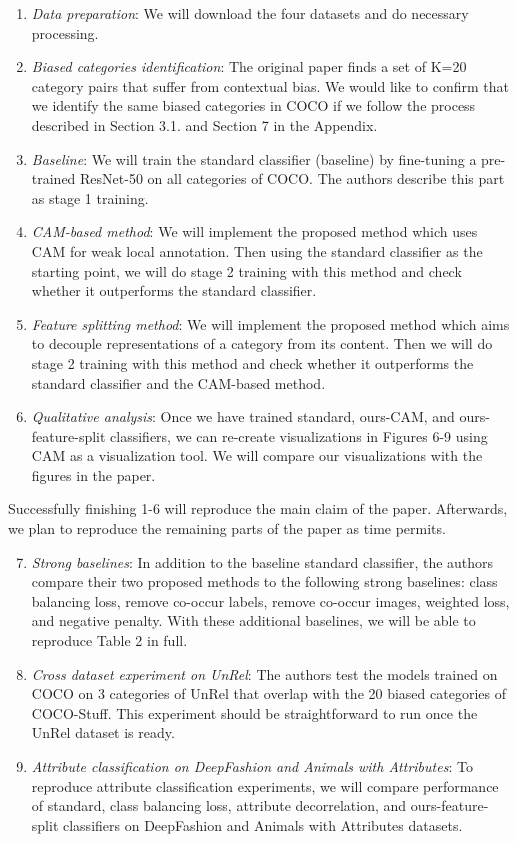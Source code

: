 \begin{enumerate}
    \item \textit{Data preparation}: We will download the four datasets and do necessary processing. 
    \item \textit{Biased categories identification}: The original paper finds a set of K=20 category pairs that suffer from contextual bias. We would like to confirm that we identify the same biased categories in COCO if we follow the process described in Section 3.1. and Section 7 in the Appendix. 
    \item \textit{Baseline}: We will train the standard classifier (baseline) by fine-tuning a pre-trained ResNet-50 on all categories of COCO. The authors describe this part as stage 1 training.
    \item \textit{CAM-based method}: We will implement the proposed method which uses CAM for weak local annotation. Then using the standard classifier as the starting point, we will do stage 2 training with this method and check whether it outperforms the standard classifier.
    \item \textit{Feature splitting method}: We will implement the proposed method which aims to decouple representations of a category from its content. Then we will do stage 2 training with this method and check whether it outperforms the standard classifier and the CAM-based method.
    \item \textit{Qualitative analysis}: Once we have trained standard, ours-CAM, and ours-feature-split classifiers, we can re-create visualizations in Figures 6-9 using CAM as a visualization tool. We will compare our visualizations with the figures in the paper.
\end{enumerate}

Successfully finishing 1-6 will reproduce the main claim of the paper. Afterwards, we plan to reproduce the remaining parts of the paper as time permits. 

\begin{enumerate}
\setcounter{enumi}{6}
    \item \textit{Strong baselines}: In addition to the baseline standard classifier, the authors compare their two proposed methods to the following strong baselines: class balancing loss, remove co-occur labels, remove co-occur images, weighted loss, and negative penalty. With these additional baselines, we will be able to reproduce Table 2 in full.
    \item \textit{Cross dataset experiment on UnRel}: The authors test the models trained on COCO on 3 categories of UnRel that overlap with the 20 biased categories of COCO-Stuff. This experiment should be straightforward to run once the UnRel dataset is ready.
    \item \textit{Attribute classification on DeepFashion and Animals with Attributes}: To reproduce attribute classification experiments, we will compare performance of standard, class balancing loss, attribute decorrelation, and ours-feature-split classifiers on DeepFashion and Animals with Attributes datasets. 
\end{enumerate}